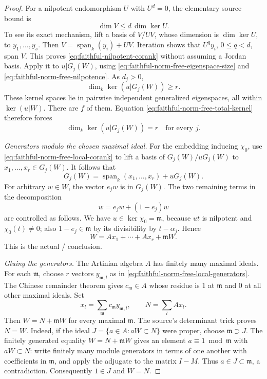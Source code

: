 \begin{proof}
For a nilpotent endomorphism \(U\) with \(U^d=0\), the elementary
source bound is
\[
                     \dim V\le d\,\dim\ker U.
 \tag{NF10}\label{eq:faithful-nilpotent-corank}
\]
To see its exact mechanism, lift a basis of \(V/UV\), whose
dimension is \(\dim\ker U\), to \(y_1,\ldots,y_s\).
Then \(V=\operatorname{span}_k(y_i)+UV\).
Iteration shows that \(U^q y_i\), \(0\le q<d\), span \(V\).
This proves \eqref{eq:faithful-nilpotent-corank} without assuming
a Jordan basis.
Apply it to \(u|G_j(W)\), using
\eqref{eq:faithful-norm-free-eigenspace-size} and
\eqref{eq:faithful-norm-free-nilpotence}.
As \(d_j>0\),
\[
                          \dim_k\ker(u|G_j(W))\ge r.
\]
These kernel spaces lie in pairwise independent generalized
eigenspaces, all within \(\ker(u|W)\).
There are \(f\) of them.  Equation
\eqref{eq:faithful-norm-free-total-kernel} therefore forces
\[
                       \dim_k\ker(u|G_j(W))=r
                           \quad\text{for every }j.
 \tag{NF11}\label{eq:faithful-norm-free-local-corank}
\]

\emph{Generators modulo the chosen maximal ideal.}
For the embedding inducing \(\chi_0\), use
\eqref{eq:faithful-norm-free-local-corank} to lift a basis of
\(G_j(W)/uG_j(W)\) to \(x_1,\ldots,x_r\in G_j(W)\).
It follows that
\[
       G_j(W)=\operatorname{span}_k(x_1,\ldots,x_r)+uG_j(W).
\]
For arbitrary \(w\in W\), the vector \(e_jw\) is in \(G_j(W)\).
The two remaining terms in the decomposition
\[
          w=e_jw+(1-e_j)w
\]
are controlled as follows.
We have \(u\in\ker\chi_0=\mathfrak m\), because \(ut\) is
nilpotent and \(\chi_0(t)\ne0\); also \(1-e_j\in\mathfrak m\)
by its divisibility by \(t-\alpha_j\).
Hence
\[
 W=A x_1+\cdots+A x_r+\mathfrak mW .
 \tag{NF12}\label{eq:faithful-norm-free-local-generators}
\]
This is the actual / conclusion.

\emph{Gluing the generators.}
The Artinian algebra \(A\) has finitely many maximal ideals.
For each \(\mathfrak m\), choose \(r\) vectors
\(y_{\mathfrak m,l}\) as in
\eqref{eq:faithful-norm-free-local-generators}.
The Chinese remainder theorem gives \(c_{\mathfrak m}\in A\)
whose residue is \(1\) at \(\mathfrak m\) and \(0\) at all
other maximal ideals.
Set
\[
               x_l=\sum_{\mathfrak m}
                                  c_{\mathfrak m}y_{\mathfrak m,l},
       \qquad N=\sum_l A x_l.
\]
Then \(W=N+\mathfrak mW\) for every maximal \(\mathfrak m\).
The source's determinant trick proves \(N=W\).
Indeed, if the ideal
\(J=\{a\in A:aW\subset N\}\) were proper, choose
\(\mathfrak m\supset J\).
The finitely generated equality \(W=N+\mathfrak mW\) gives
an element \(a\equiv1\bmod\mathfrak m\) with \(aW\subset N\):
write finitely many module generators in terms of one another
with coefficients in \(\mathfrak m\), and apply the adjugate
to the matrix \(I-M\).
Thus \(a\in J\subset\mathfrak m\), a contradiction.
Consequently \(1\in J\) and \(W=N\).


\end{proof}
